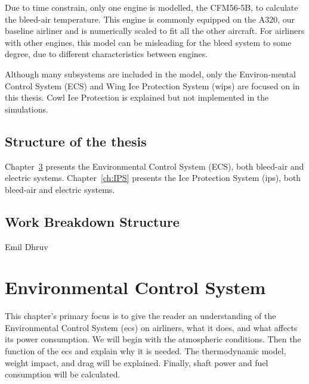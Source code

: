 \documentclass[english]{kththesis}
\begin{document}
Due to time constrain, only one engine is modelled, the CFM56-5B, to calculate the bleed-air temperature. This engine is commonly equipped on the A320, our baseline airliner and is numerically scaled to fit all the other aircraft. For airliners with other engines, this model can be misleading for the bleed system to some degree, due to different characteristics between engines.

Although many subsystems are included in the model, only the Environ-mental Control System (ECS) and Wing Ice Protection System (\acrshort{wips}) are focused on in this thesis. Cowl Ice Protection is explained but not implemented in the simulations.

\section{Structure of the thesis}
Chapter~\ref{ch:ECS} presents the Environmental Control System (ECS), both bleed-air and electric systems.
Chapter~\ref{ch:IPS} presents the Ice Protection System (\acrshort{ips}), both bleed-air and electric systems.

\section{Work Breakdown Structure}
Emil
Dhruv


\cleardoublepage
\chapter{Environmental Control System}
\label{ch:ECS}

This chapter's primary focus is to give the reader an understanding of the Environmental Control System (\acrshort{ecs}) on airliners, what it does, and what affects its power consumption.  We will begin with the atmospheric conditions. Then the function of the \acrshort{ecs} and explain why it is needed. The thermodynamic model, weight impact, and drag will be explained. Finally, shaft power and fuel consumption will be calculated.

\end{document}
